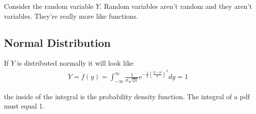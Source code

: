 \documentclass{article}
\begin{document}
Consider the random variable $Y$. Random variables aren't random and they aren't variables. They're really more like functions. \\

\subsection{Normal Distribution}
If $Y$ is distributed normally it will look like 
\begin{align}
    Y = f(y) = \int_{- \infty}^{\infty} \frac{1}{\sigma \sqrt{2 \pi}} e^{-\frac{1}{2}(\frac{y - \mu}{\sigma})^2} dy = 1
\end{align}

the inside of the integral is the probability density function. The integral of a pdf must equal 1. 






\end{document}
